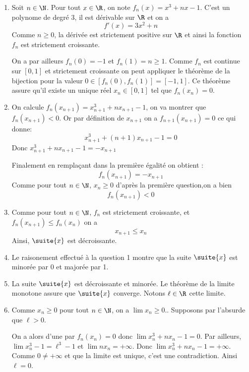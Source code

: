 \begin{correction}
\begin{enumerate}
\item  Soit $n\in \N$. Pour tout $x\in \R$, on note $f_n(x) = x^3+nx-1$. C'est un polynome de degré 3, il est dérivable sur $\R$ et on a 
$$f'(x) = 3x^2 +n $$
Comme $n\geq 0$, la dérivée est strictement positive sur $\R$ et ainsi la fonction $f_n$ est strictement croissante. 

On a par ailleurs $f_n(0) = -1$ et $f_n(1) =n\geq  1$. Comme $f_n$ est continue sur $[0,1]$ et strictement croissante on peut appliquer le théorème de la bijection pour la valeur $0\in [f_n(0), f_n(1)]=[-1, 1]$. Ce théorème assure qu'il existe un unique réel $x_n\in [0,1]$ tel que $f_n(x_n) = 0$. 


\item On calcule $f_n(x_{n+1}) = x_{n+1}^3 +n x_{n+1}-1$, on va montrer que $f_n(x_{n+1})<0$. Or par définition de $x_{n+1}$ on a $f_{n+1} (x_{n+1})=0$ ce qui donne:
$$ x_{n+1}^3 +(n+1) x_{n+1}-1=0$$
Donc $x_{n+1}^3 +n x_{n+1}-1=-x_{n+1}$

Finalement en remplaçant dans la première égalité on obtient : 
$$f_n(x_{n+1}) =-x_{n+1}$$
Comme pour tout $n\in \N$, $x_n\geq 0$ d'après la première question,on a bien 
$$f_n(x_{n+1}) <0$$

\item Comme pour tout $n\in \N$,  $f_n $ est strictement croissante, 
et $f_n(x_{n+1}) \leq f_n(x_n)$ on a 
$$x_{n+1} \leq x_n$$
Ainsi, $\suite{x}$ est décroissante. 

\item Le raisonement effectué à la question 1 montre que la suite $\suite{x}$ est minorée par 0 et majorée par 1. 

\item La suite $\suite{x}$ est décroissante et minorée. Le théorème de la limite monotone assure que $\suite{x}$ converge. Notons $\ell\in \R$ cette limite. 

\item Comme $x_n\geq 0$ pour tout $n\in \N$, on a $\lim x_n \geq 0. $. Supposons par l'absurde que $\ell>0$. 

On a alors d'une par $f_n(x_n) =0$ donc $\lim x_n^3 +nx_n-1=0$. Par ailleurs,  $\lim x_n^3 -1=\ell^3 -1$ et $\lim nx_n =+\infty$. Donc 
$\lim x_n^3+nx_n -1=+\infty$. 
Comme $0\neq +\infty$ et que la limite est unique, c'est une contradiction. Ainsi $\ell=0$. 




\end{enumerate}


\end{correction}




